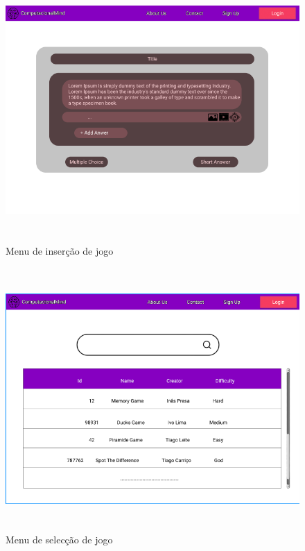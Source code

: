 \documentclass[11pt,a4paper]{report}
\begin{document}
\begin{figure}[H]
\centering
\includegraphics[width = 14cm,height = 10cm]{MockTeacherMenu.png}
\caption{Menu de inserção de jogo}
\label{fig:MockTeacherMenu}
\end{figure}


\begin{figure}[H]
\centering
\includegraphics[width = 14cm,height = 10cm]{MockUserSelectGame.png}
\caption{Menu de selecção de jogo}
\label{fig:MockUserSelectGame}
\end{figure}
\end{document}
